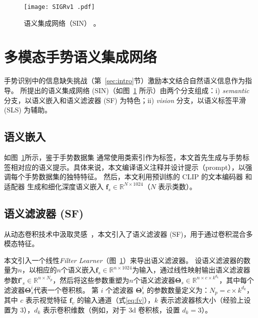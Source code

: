 \begin{figure}[tb]
\centering
\texttt{[image: SIGRv1 .pdf]}
\caption{语义集成网络（SIN） 。}%
\label{fig:SIN}
\end{figure}
\section{多模态手势语义集成网络}
\label{sec:SIN}
手势识别中的信息缺失挑战（第~\ref{sec:intro}节）激励本文结合自然语义信息作为指导。
所提出的语义集成网络 (SIN)（如图~\ref{fig:SIN} 所示）由两个分支组成：i) \emph{semantic} 分支，以语义嵌入和语义滤波器 (SF) 为特色；ii) \emph{vision} 分支，以语义标签平滑 (SLS) 为辅助。

\subsection{语义嵌入}
如图~\ref{fig:SIN}所示，鉴于手势数据集 \cite{wan2020chalearn,tang2017action,molchanov2016online} 通常使用类索引作为标签，本文首先生成与手势标签相对应的语义提示。具体来说，本文编译语义注释并设计提示（prompt），以强调每个手势数据集的独特特征。
然后，本文利用预训练的 CLIP 的文本编码器 \cite{radford2021learning} 和适配器 \cite{gao2024clip} 生成和细化深度语义嵌入 $\mathbf{f}_{s}\in \mathbb{R}^{N\times 1024}$（$N$ 表示类数）。%

\subsection{语义滤波器 (SF)}
从动态卷积技术中汲取灵感~\cite{yang2019condconv,chen2020dynamic}，本文引入了语义滤波器 (SF)，用于通过卷积混合多模态特征。%

本文引入一个线性\emph{Filter Learner}（图~\ref{fig:SIN}）来导出语义滤波器。
设语义滤波器的数量为$n$，以相应的$n$个语义嵌入$\mathbf{f}_{s} \in \mathbb{R}^{n\times 1024}$为输入，通过线性映射输出语义滤波器参数$\mathbf{f'}_{s}\in \mathbb{R}^{n\times N_p}$，然后将这些参数重塑为$n$个语义滤波器$\boldsymbol{\Theta}_{s}\in \mathbb{R}^{n\times c\times k^{d_k}}$，其中每个滤波器$\boldsymbol{\Theta}_{s}^i$代表一个卷积核。
第 $i$ 个滤波器 $\boldsymbol{\Theta}_{s}^i$ 的参数数量定义为：$N_p=c\times k^{d_k}$，其中 $c$ 表示视觉特征 $\mathbf{f}_{v}$ 的输入通道（式\eqref{eq:fv}），$k$ 表示滤波器核大小（经验上设置为 3），$d_k$ 表示卷积维数（例如，对于 3d 卷积核，设置 $d_k=3$）。

